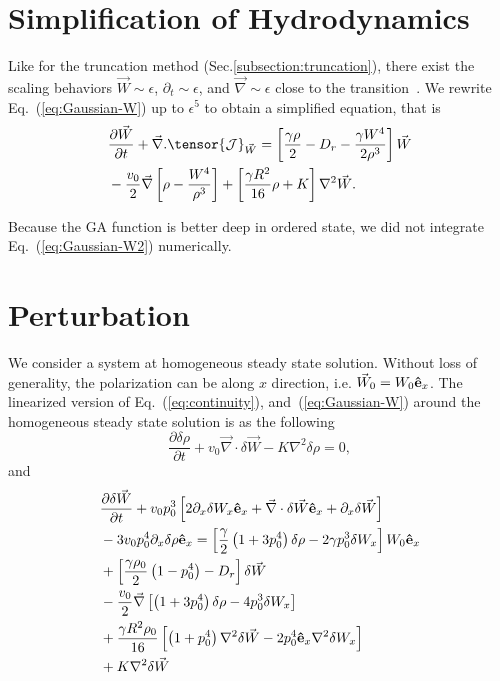 \documentclass[reprint,floatfix,amsmath,amssymb,aps,pre,showkeys,showpacs,superscriptaddress]{revtex4-1}
\newcommand{\grad}{\vec{\nabla}}
\newcommand{\Dif}[2]{\frac{\partial #1}{\partial #2}}
\newcommand{\p}{p}
\newcommand{\e}{{\bf \hat{e}}}
\newcommand{\w}{W}
\newcommand{\vw}{\vec{\w}}
\newcommand{\req}[1]{Eq.~(\ref{#1})}
\newcommand{\reqs}[2]{Eq.~(\ref{#1}), and~(\ref{#2})}
\begin{document}
\appendix

\section{Simplification of Hydrodynamics}
\label{ap:simplification}

Like for the truncation method (Sec.\ref{subsection:truncation}), there exist the scaling behaviors $\vw \sim \epsilon$, $\partial_t \sim \epsilon$, and $\grad \sim \epsilon$ close to the transition~\cite{Bertin2009}. We rewrite \req{eq:Gaussian-W} up to $\epsilon^5$ to obtain a simplified equation, that is
\begin{equation}
\begin{aligned}
&\Dif{{\vw}}{t} + \grad. \tensor{\mathcal{J}}_{\vw} = \left[ \frac{\gamma \rho}{2} - D_r - \frac{\gamma W^4}{2 \rho^3} \right] \vw \\
&- \frac{v_0}{2} \grad \left[  \rho - \frac{W^4}{\rho^3} \right] + \left[ \frac{\gamma R^2}{16} \rho + K \right] \nabla^2 \vw.
\end{aligned}
\label{eq:Gaussian-W2}
\end{equation}

Because the GA function is better deep in ordered state, we did not integrate \req{eq:Gaussian-W2} numerically. 

\section{Perturbation}
\label{ap:perturbation}

We consider a system at homogeneous steady state solution. Without loss of generality, the polarization can be along $x$ direction, i.e. $\vw_0 = \w_0 \e_x$. The linearized version of \reqs{eq:continuity}{eq:Gaussian-W} around the homogeneous steady state solution  is as the following
\begin{equation}
\Dif{\delta \rho}{t} + v_0 \grad \cdot \delta \vw - K \nabla^2 \delta \rho = 0,
\label{eq:Gaussian-drho}
\end{equation}
and
\begin{equation}
\begin{aligned}
&\Dif{\delta {\vw}}{t} + v_0 \p_0^3 \left[ 2 \partial_x \delta \w_x \e_x +  \grad \cdot \delta \vw \e_x + \partial_x \delta \vw \right] \\
&- 3 v_0 \p_0^4 \partial_x \delta \rho \e_x = \left[ \frac{\gamma}{2} \left( 1 + 3 \p_0^4 \right) \delta \rho - 2 \gamma \p_0^3 \delta \w_x \right] \w_0 \e_x \\
&+\left[ \frac{\gamma \rho_0}{2} \left( 1 - \p_0^4 \right) - D_r  \right] \delta \vw \\
&- \frac{v_0}{2} \grad \left[ \left( 1 + 3 \p_0^4 \right) \delta \rho - 4 \p_0^3 \delta \w_x \right] \\
&+ \frac{\gamma R^2 \rho_0}{16} \left[ \left( 1+\p_0^4 \right) \nabla^2 \delta \vw - 2 \p_0^4 \e_x \nabla^2 \delta \w_x \right] \\
&+ K \nabla^2 \delta \vw
\end{aligned}
\label{eq:Gaussian-dw}
\end{equation}
\end{document}
